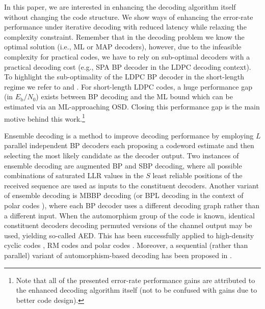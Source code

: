 \documentclass[conference]{IEEEtran}
\newcommand\new[1]{#1}
\begin{document}
\begin{NoHyper}
In this paper, we are interested in enhancing the decoding algorithm itself without changing the code structure.
\new{We show ways of enhancing the error-rate performance under iterative decoding with reduced latency while relaxing the complexity constraint.}
Remember that in the decoding problem we know the optimal solution (i.e., \ac{ML} or \ac{MAP} decoders), however, due to the infeasible complexity for practical codes, we have to rely on sub-optimal decoders with a practical decoding cost (e.g., \ac{SPA} \ac{BP} decoder in the \ac{LDPC} decoding context).
To highlight the sub-optimality of the \ac{LDPC} \ac{BP} decoder in the short-length regime we refer to \cite[Fig.~4]{OSD1} and \cite[Fig.~10]{Buchberger_Journal}.
For short-length \ac{LDPC} codes, a huge performance gap (in $E_\mathrm{b}/N_0$) exists between \ac{BP} decoding and the \ac{ML} bound which can be estimated via an \ac{ML}-approaching \ac{OSD}.
Closing this performance gap is the main motive behind this work.\footnote{Note that all of the presented error-rate performance gains are attributed to the enhanced decoding algorithm itself (not to be confused with gains due to better code design).}

Ensemble decoding is a method to improve decoding performance by employing $L$ parallel independent \ac{BP} decoders each proposing a codeword estimate and then selecting the most likely candidate as the decoder output. \new{Two instances of ensemble decoding are augmented \ac{BP} \cite{FossorierAugmentedBP} and \ac{SBP} \cite{WehnSaturatedMinSum} decoding, where all possible combinations of saturated \ac{LLR} values in the $S$ least reliable positions of the received sequence are used as inputs to the constituent decoders. Another variant of ensemble decoding is \ac{MBBP} decoding \cite{Huber} (or \ac{BPL} decoding in the context of polar codes \cite{elkelesh2018belief}), where each \ac{BP} decoder uses a different decoding graph rather than a different input.} When the automorphism group of the code is known, identical constituent decoders decoding permuted versions of the channel output may be used, yielding so-called \ac{AED}. This has been successfully applied to high-density cyclic codes \cite{Hehn_MBBP_cyclic}, \ac{RM} codes \cite{rm_automorphism_ensemble_decoding} and polar codes \cite{PolarAutomorphisms_ISIT21}. Moreover, a sequential (rather than parallel) variant of automorphism-based decoding has been proposed in \cite{Dimnik_RRD_HDPC}.


\end{NoHyper}
\end{document}
